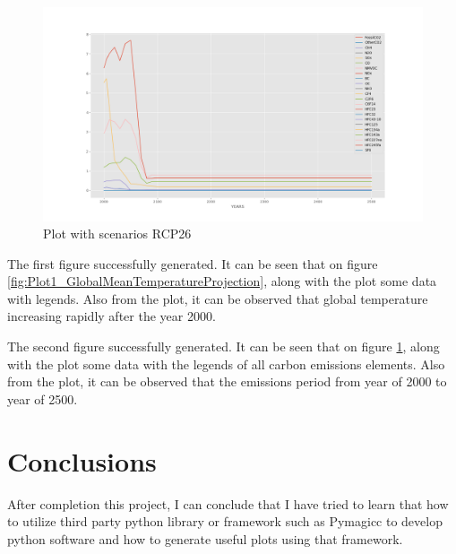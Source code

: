 \documentclass[12pt, letterpaper]{article}
\begin{document}
\begin{figure}
\includegraphics[width=1\textwidth]{Plot2_RCP26}
\caption{Plot with scenarios RCP26}
\label{fig:Plot2_RCP26}
\end{figure}


The first figure successfully generated. It can be seen that on figure \ref{fig:Plot1_GlobalMeanTemperatureProjection}, along with the plot some data with legends. Also from the plot, it can be observed that global temperature increasing rapidly after the year 2000. 

The second figure successfully generated. It can be seen that on figure \ref{fig:Plot2_RCP26}, along with the plot some data with the legends of all carbon emissions elements. Also from the plot, it can be observed that the emissions period from year of 2000 to year of 2500.

\section{Conclusions}
After completion this project, I can conclude that I have tried to learn that how to utilize third party python library or framework such as Pymagicc to develop python software and how to generate useful plots using that framework.
\end{document}
